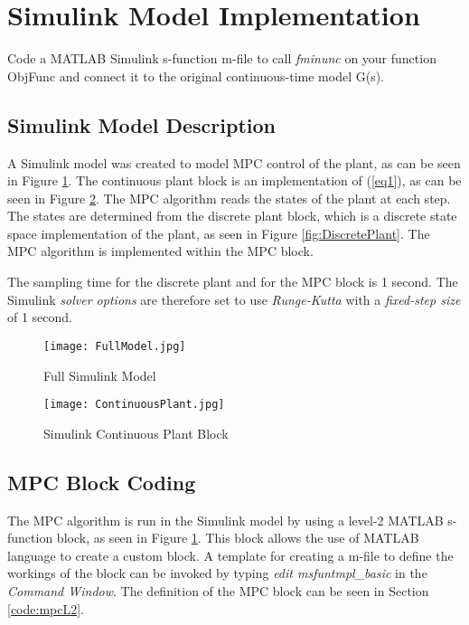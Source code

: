 \documentclass[12pt]{article}
\newenvironment{problem}[2][Problem]{\begin{trivlist}
		\item[\hskip \labelsep {\bfseries #1}\hskip \labelsep {\bfseries #2.}]}{\end{trivlist}}
\begin{document}
\section{Simulink Model Implementation}

\begin{problem}{9} Code a MATLAB Simulink s-function m-file to call \textit{fminunc} on your function ObjFunc and connect it to the original continuous-time model G(s). \end{problem}

\subsection{Simulink Model Description}

A Simulink model was created to model MPC control of the plant, as can be seen in Figure \ref{fig:FullModel}. The continuous plant block is an implementation of (\ref{eq1}), as can be seen in Figure \ref{fig:ContinuousPlant}. The MPC algorithm reads the states of the plant at each step. The states are determined from the discrete plant block, which is a discrete state space implementation of the plant, as seen in Figure \ref{fig:DiscretePlant}. The MPC algorithm is implemented within the MPC block.

The sampling time for the discrete plant and for the MPC block is 1 second. The Simulink \textit{solver options} are therefore set to use \textit{Runge-Kutta} with a \textit{fixed-step size} of 1 second.

\begin{figure}[h!]
	\texttt{[image: FullModel.jpg]}
	\centering
	\caption{Full Simulink Model}
	\label{fig:FullModel}
\end{figure}

\begin{figure}[h!]
	\texttt{[image: ContinuousPlant.jpg]}
	\centering
	\caption{Simulink Continuous Plant Block}
	\label{fig:ContinuousPlant}
\end{figure}

\subsection{MPC Block Coding}

The MPC algorithm is run in the Simulink model by using a level-2 MATLAB s-function block, as seen in Figure \ref{fig:FullModel}. This block allows the use of MATLAB language to create a custom block. A template for creating a m-file to define the workings of the block can be invoked by typing \textit{edit msfuntmpl\_basic} in the \textit{Command Window}. The definition of the MPC block can be seen in Section \ref{code:mpcL2}.
\end{document}
